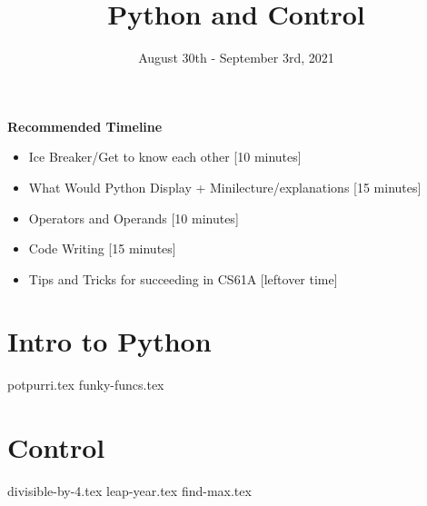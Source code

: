 \documentclass{exam}
\title{Python and Control}
\date{August 30th - September 3rd, 2021}
\begin{document}
\maketitle
\begin{guide}
\textbf{Recommended Timeline}
\begin{itemize}
  \item Ice Breaker/Get to know each other [10 minutes]
  \item What Would Python Display + Minilecture/explanations [15 minutes]\item Operators and Operands [10 minutes]
  \item Code Writing [15 minutes]
  \item Tips and Tricks for succeeding in CS61A [leftover time]
\end{itemize}
\end{guide}


\section{Intro to Python}
\begin{questions}
{potpurri.tex}
{funky-funcs.tex}
\end{questions}

\section{Control}
\begin{questions}
{divisible-by-4.tex}
{leap-year.tex}
{find-max.tex}
\end{questions}
\end{document}
